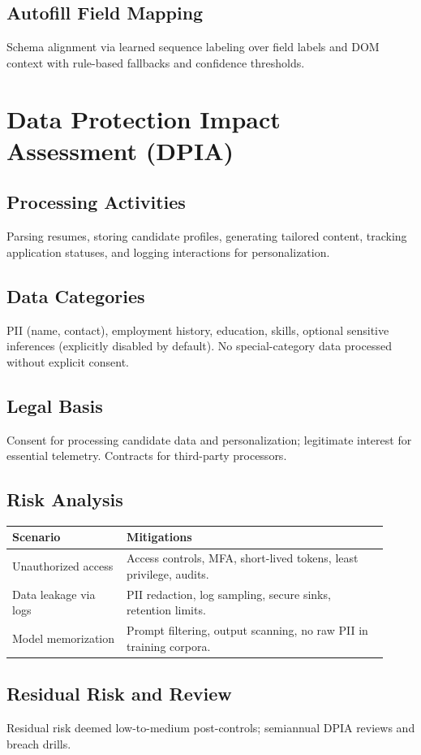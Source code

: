 \documentclass[12pt,a4paper]{article}
\begin{document}
\subsection{Autofill Field Mapping}
Schema alignment via learned sequence labeling over field labels and DOM context with rule-based fallbacks and confidence thresholds.

\section{Data Protection Impact Assessment (DPIA)}
\subsection{Processing Activities}
Parsing resumes, storing candidate profiles, generating tailored content, tracking application statuses, and logging interactions for personalization.
\subsection{Data Categories}
PII (name, contact), employment history, education, skills, optional sensitive inferences (explicitly disabled by default). No special-category data processed without explicit consent.
\subsection{Legal Basis}
Consent for processing candidate data and personalization; legitimate interest for essential telemetry. Contracts for third-party processors.
\subsection{Risk Analysis}
\begin{longtable}{p{0.28\linewidth} p{0.64\linewidth}}
\toprule
\textbf{Scenario} & \textbf{Mitigations}\\
\midrule
Unauthorized access & Access controls, MFA, short-lived tokens, least privilege, audits.\\
Data leakage via logs & PII redaction, log sampling, secure sinks, retention limits.\\
Model memorization & Prompt filtering, output scanning, no raw PII in training corpora.\\
\bottomrule
\end{longtable}
\subsection{Residual Risk and Review}
Residual risk deemed low-to-medium post-controls; semiannual DPIA reviews and breach drills.
\end{document}
